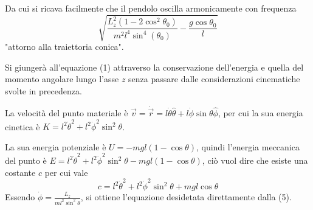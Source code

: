 \documentclass[../main.tex]{subfiles}
\begin{document}
Da cui si ricava facilmente che il pendolo oscilla armonicamente con frequenza $$\sqrt{\frac{L_z^2(1-2\cos^2\theta_0)}{m^2l^4\sin^4(\theta_0)}-\frac{g\cos\theta_0}{l}}$$ "attorno alla traiettoria conica".

\solution[2]
Si giunger\`a all'equazione (1) attraverso la conservazione dell'energia e quella del momento angolare lungo l'asse $z$ senza passare dalle considerazioni cinematiche svolte in precedenza.

La velocit\`a del punto materiale \`e $\vec{v}=\dot{\vec{r}}=l\dot{\theta}\hat{\theta}+l\dot{\phi}\sin\theta\hat{\phi}$, per cui la sua energia cinetica \`e $K=l^2\dot{\theta}^2+l^2\dot{\phi}^2\sin^2\theta$.

La sua energia potenziale \`e $U=-mgl(1-\cos\theta)$, quindi l'energia meccanica del punto \`e $E=l^2\dot{\theta}^2+l^2\dot{\phi}^2\sin^2\theta-mgl(1-\cos\theta)$, ci\`o vuol dire che esiste una costante $c$ per cui vale
\begin{equation}
c=l^2\dot{\theta}^2+l^2\dot{\phi}^2\sin^2\theta+mgl\cos\theta
\end{equation}
Essendo $\displaystyle \dot{\phi}=\frac{L_z}{ml^2\sin^2\theta}$, si ottiene l'equazione desidetata direttamente dalla (5). 
\end{document}
